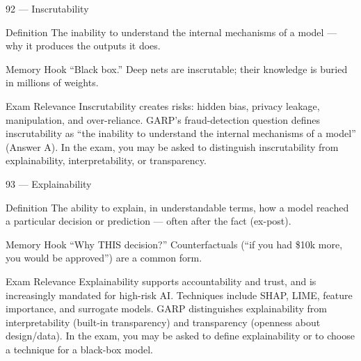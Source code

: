\documentclass[aspectratio=169,8pt]{beamer}
\begin{document}
	\begin{frame}{92 --- Inscrutability}
		\begin{block}{Definition}
			The inability to understand the internal mechanisms of a model --- why it produces the outputs it does.
		\end{block}
		\begin{block}{Memory Hook}
			``Black box.'' Deep nets are inscrutable; their knowledge is buried in millions of weights.
		\end{block}
		\begin{block}{Exam Relevance}
			Inscrutability creates risks: hidden bias, privacy leakage, manipulation, and over-reliance. GARP's fraud-detection question defines inscrutability as ``the inability to understand the internal mechanisms of a model'' (Answer A). In the exam, you may be asked to distinguish inscrutability from explainability, interpretability, or transparency.
		\end{block}
	\end{frame}
	
	\begin{frame}{93 --- Explainability}
		\begin{block}{Definition}
			The ability to explain, in understandable terms, how a model reached a particular decision or prediction --- often after the fact (ex-post).
		\end{block}
		\begin{block}{Memory Hook}
			``Why THIS decision?'' Counterfactuals (``if you had \$10k more, you would be approved'') are a common form.
		\end{block}
		\begin{block}{Exam Relevance}
			Explainability supports accountability and trust, and is increasingly mandated for high-risk AI. Techniques include SHAP, LIME, feature importance, and surrogate models. GARP distinguishes explainability from interpretability (built-in transparency) and transparency (openness about design/data). In the exam, you may be asked to define explainability or to choose a technique for a black-box model.
		\end{block}
	\end{frame}
	
\end{document}
